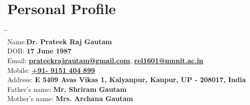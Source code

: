 \vspace{-2em}
\section{Personal Profile}
\vspace{-2.5em}
\begin{tabbing}
\=\hspace{7em}\= \kill \\
\>Name:\>\textbf{{Dr. Prateek Raj Gautam}} \\
\>DOB: \>\textbf{{17 June 1987}}\\ 
\>Email: \>\textbf{{\href{mailto:prateekrajgautam@gmail.com}{prateekrajgautam@gmail.com}}},  \textbf{{\href{mailto:rel1601@mnnit.ac.in}{rel1601@mnnit.ac.in}}} \\
\>Mobile: \>\textbf{{\href{https://t.me/prateekrajgautam}{+91- 9151 404 899}}}\\
\>Address: \>\textbf{{E 540\/9 Avas Vikas 1, Kalyanpur, Kanpur, UP - 208017, India}}\\
\>Father’s name: \>\textbf{{Mr. Shriram Gautam}} \\
\>Mother’s name: \>\textbf{{Mrs. Archana Gautam}}
\end{tabbing}
\vspace{-2em}
\sectionline